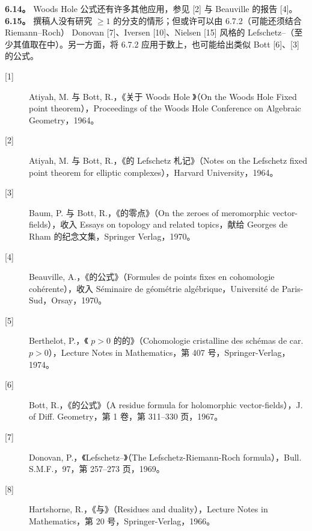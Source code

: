 \textbf{6.14。} Woods Hole 公式还有许多其他应用，参见 [2] 与 Beauville 的报告 [4]。
\textbf{6.15。} 撰稿人没有研究 $\geq1$ 的分支的情形；但或许可以由 6.7.2（可能还须结合 Riemann--Roch） Donovan [7]、Iversen [10]、Nielsen [15] 风格的 Lefschetz--（至少其值取在中）。另一方面，将 6.7.2 应用于数上，也可能给出类似 Bott [6]、[3] 的公式。
\begin{description}
\item[{[1]}] Atiyah, M. 与 Bott, R.，《关于 Woods Hole 》（On the Woods Hole Fixed point theorem），Proceedings of the Woods Hole Conference on Algebraic Geometry，1964。
\item[{[2]}] Atiyah, M. 与 Bott, R.，《的 Lefschetz 札记》（Notes on the Lefschetz fixed point theorem for elliptic complexes），Harvard University，1964。
\item[{[3]}] Baum, P. 与 Bott, R.，《的零点》（On the zeroes of meromorphic vector-fields），收入 Essays on topology and related topics，献给 Georges de Rham 的纪念文集，Springer Verlag，1970。
\item[{[4]}] Beauville, A.，《的公式》（Formules de points fixes en cohomologie cohérente），收入 Séminaire de géométrie algébrique，Université de Paris-Sud，Orsay，1970。
\item[{[5]}] Berthelot, P.，《 $p>0$ 的的》（Cohomologie cristalline des schémas de car. $p>0$），Lecture Notes in Mathematics，第 407 号，Springer-Verlag，1974。
\item[{[6]}] Bott, R.，《的公式》（A residue formula for holomorphic vector-fields），J. of Diff. Geometry，第 1 卷，第 311--330 页，1967。
\item[{[7]}] Donovan, P.，《Lefschetz--》（The Lefschetz-Riemann-Roch formula），Bull. S.M.F.，97，第 257--273 页，1969。
\item[{[8]}] Hartshorne, R.，《与》（Residues and duality），Lecture Notes in Mathematics，第 20 号，Springer-Verlag，1966。

\end{description}
